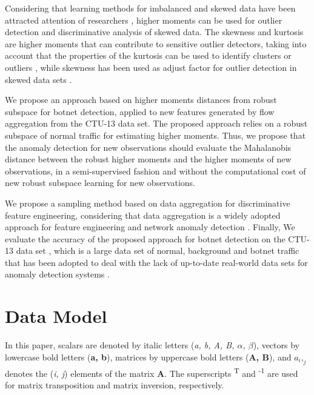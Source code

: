 \documentclass[review]{elsarticle}
\begin{document}
Considering that learning methods for imbalanced and skewed data have been attracted attention of researchers \cite{Phua2004minority,hubert2009robustskewed}, higher moments can be used for outlier detection and discriminative analysis of skewed data. The skewness and kurtosis are higher moments that can contribute to sensitive outlier detectors, taking into account that the properties of the kurtosis can be used to identify clusters or outliers \cite{pena2010eigenvectors}, while skewness has been used as adjust factor for outlier detection in skewed data sets \cite{hubert2009robustskewed}.

We propose an approach based on higher moments distances from robust subspace for botnet detection, applied to new features generated by flow aggregation from the CTU-13 data set. The proposed approach relies on a robust subspace of normal traffic for estimating higher moments. Thus, we propose that the anomaly detection for new observations should evaluate the Mahalanobis distance between the robust higher moments and the higher moments of new observations, in a semi-supervised fashion and without the computational cost of new robust subspace learning for new observations. 

We propose a sampling method based on data aggregation for discriminative feature engineering, considering that data aggregation is a widely adopted approach for feature engineering \cite{garcia2014empirical, chandrashekar2014survey,acarali2016survey} and network anomaly detection \cite{lakhina2005mining, callegari2011novel, vieira2017model}. Finally, We evaluate the accuracy of the proposed approach for botnet detection on the CTU-13 data set \cite{garcia2014empirical}, which is a large data set of normal, background and botnet traffic that has been adopted to deal with the lack of up-to-date real-world data sets for anomaly detection systems \cite{osanaiye2016distributed}. 

\section{Data Model}
\label{sec:datamodel}

In this paper, scalars are denoted by italic letters (\emph{a, b, A, B, $α$, $β$}), vectors by lowercase bold letters (\textbf{a, b}), matrices by uppercase bold letters (\textbf{A, B}), and $a_i,_j$ denotes the (\emph{i, j}) elements of the matrix \textbf{A}. The superscripts \textsuperscript{T} and \textsuperscript{-1} are used for matrix transposition and matrix inversion, respectively.
\end{document}
